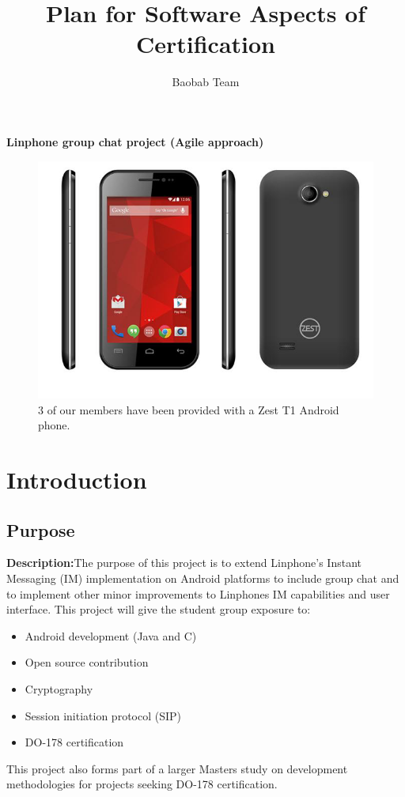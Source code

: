 \documentclass[a4paper]{article}
\title{Plan for Software Aspects of Certification}
\author{Baobab Team}
\begin{document}
\newpage


\newpage

\tableofcontents

\newpage
\setlength{\voffset}{-3cm}
\begin{center}
\textbf{\Huge{Linphone group chat project (Agile approach)}}
\begin{figure}
\centering
\includegraphics[width=1\linewidth]{./pictures/linphone.jpeg}
\caption{\label{fig:Linphone}3 of our members have been provided with a Zest T1 Android phone.}
\end{figure}
\end{center}

\newpage


\section{Introduction}

\subsection{Purpose}
\textbf{Description:}The purpose of this project is to extend Linphone's Instant Messaging (IM) implementation on Android platforms to include group chat and to implement other minor improvements to Linphones IM capabilities and user interface.
This project will give the student group exposure to:   
 \begin{itemize}
	\item Android development (Java and C)
	\item Open source contribution
	\item Cryptography
	\item Session initiation protocol (SIP)
	\item DO-178 certification
\end{itemize}
This project also forms part of a larger Masters study on development methodologies for projects seeking DO-178 certification.
\end{document}
